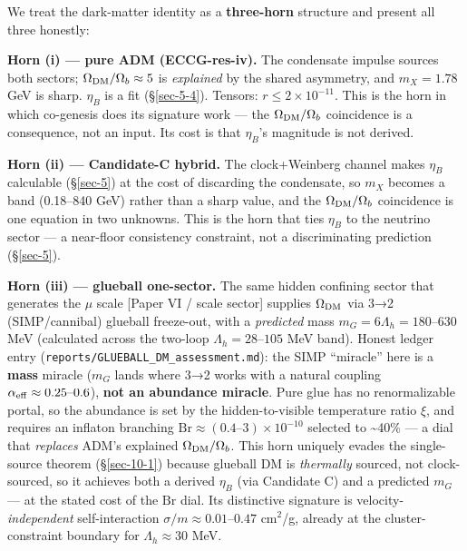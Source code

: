 \documentclass[aps,prd,preprint,nofootinbib,superscriptaddress]{revtex4-2}
\begin{document}
We treat the dark-matter identity as a \textbf{three-horn} structure and
present all three honestly:

\textbf{Horn (i) --- pure ADM (ECCG-res-iv).} The condensate impulse
sources both sectors; \(\Omega_{\rm DM}/\Omega_b \approx 5\) is
\emph{explained} by the shared asymmetry, and \(m_X = 1.78\) GeV is
sharp. \(\eta_B\) is a fit (§\ref{sec-5-4}). Tensors:
\(r \leq 2\times10^{-11}\). This is the horn in which co-genesis does
its signature work --- the \(\Omega_{\rm DM}/\Omega_b\) coincidence is a
consequence, not an input. Its cost is that \(\eta_B\)'s magnitude is
not derived.

\textbf{Horn (ii) --- Candidate-C hybrid.} The clock+Weinberg channel
makes \(\eta_B\) calculable (§\ref{sec-5}) at the cost of discarding the
condensate, so \(m_X\) becomes a band (0.18--840 GeV) rather than a
sharp value, and the \(\Omega_{\rm DM}/\Omega_b\) coincidence is one
equation in two unknowns. This is the horn that ties \(\eta_B\) to the
neutrino sector --- a near-floor consistency constraint, not a
discriminating prediction (§\ref{sec-5}).

\textbf{Horn (iii) --- glueball one-sector.} The same hidden confining
sector that generates the \(\mu\) scale {[}Paper VI / scale sector{]}
supplies \(\Omega_{\rm DM}\) via 3→2 (SIMP/cannibal) glueball
freeze-out, with a \emph{predicted} mass
\(m_G = 6\Lambda_h = 180\text{–}630\) MeV (calculated across the
two-loop \(\Lambda_h = 28\text{–}105\) MeV band). Honest ledger entry
(\texttt{reports/\allowbreak GLUEBALL\_\allowbreak DM\_\allowbreak assessment.\allowbreak md}): the SIMP ``miracle''
here is a \textbf{mass} miracle (\(m_G\) lands where 3→2 works with a
natural coupling \(\alpha_{\rm eff} \approx 0.25\text{–}0.6\)),
\textbf{not an abundance miracle}. Pure glue has no renormalizable
portal, so the abundance is set by the hidden-to-visible temperature
ratio \(\xi\), and requires an inflaton branching
\(\mathrm{Br} \approx (0.4\text{–}3)\times10^{-10}\) selected to
\textasciitilde40\% --- a dial that \emph{replaces} ADM's explained
\(\Omega_{\rm DM}/\Omega_b\). This horn uniquely evades the
single-source theorem (§\ref{sec-10-1}) because glueball DM is
\emph{thermally} sourced, not clock-sourced, so it achieves both a
derived \(\eta_B\) (via Candidate C) and a predicted \(m_G\) --- at the
stated cost of the \(\mathrm{Br}\) dial. Its distinctive signature is
velocity-\emph{independent} self-interaction
\(\sigma/m \approx 0.01\text{–}0.47\) cm\(^{2}\)/g, already at the
cluster-constraint boundary for \(\Lambda_h \approx 30\) MeV.
\end{document}
